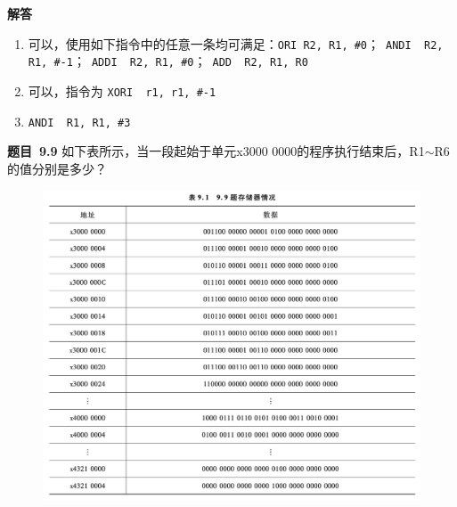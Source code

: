 \documentclass[10pt,a4paper,UTF8]{ctexart}
\newcommand{\problemname}{待定义}
\newenvironment{problem}{\begin{shaded}\par\noindent\textbf{题目\  \problemname}}{\end{shaded}\par}
\newenvironment{solution}{\par\noindent\textbf{解答}\ }{\par}
\begin{document}
\begin{solution}
	\begin{enumerate}[(1)]
		\item 可以，使用如下指令中的任意一条均可满足：\verb|ORI R2, R1, #0|；\ 
		\verb|ANDI  R2, R1, #-1|；\ \verb|ADDI  R2, R1, #0|；\ \verb|ADD  R2, R1, R0|
		\item 可以，指令为 \verb|XORI  r1, r1, #-1|
		\item \verb|ANDI  R1, R1, #3|
	\end{enumerate}

\end{solution}


\renewcommand{\problemname}{9.9}
\begin{problem}
	如下表所示，当一段起始于单元x3000 0000的程序执行结束后，R1$\sim$R6的值分别是多少？
\end{problem}

\begin{figure}[H]
	\centering
	\includegraphics[scale=0.5]{img/9.9}
\end{figure}
\end{document}
